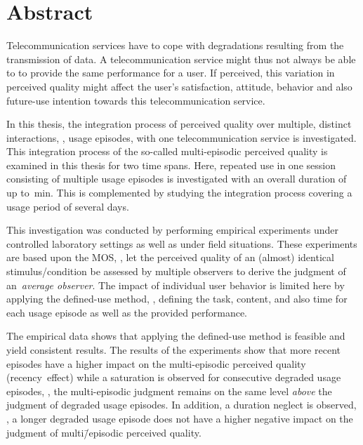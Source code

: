 
\chapter*{Abstract}
Telecommunication services have to cope with degradations resulting from the transmission of data.
A telecommunication service might thus not always be able to to provide the same performance for a user.
If perceived, this variation in perceived quality might affect the user's satisfaction, attitude, behavior and also future-use intention towards this telecommunication service.

In this thesis, the integration process of perceived quality over multiple, distinct interactions, \ie, usage episodes, with one telecommunication service is investigated.
This integration process of the so-called multi-episodic perceived quality is examined in this thesis for two time spans.
Here, repeated use in one session consisting of multiple usage episodes is investigated with an overall duration of up to~\unit[45]{min}.
This is complemented by studying the integration process covering a usage period of several days.

This investigation was conducted by performing empirical experiments under controlled laboratory settings as well as under field situations.
These experiments are based upon the \acs{MOS}, \ie, let the perceived quality of an (almost) identical stimulus/condition be assessed by multiple observers to derive the judgment of an~\emph{average observer}.
The impact of individual user behavior is limited here by applying the defined-use method, \ie, defining the task, content, and also time for each usage episode as well as the provided performance.

The empirical data shows that applying the defined-use method is feasible and yield consistent results.
The results of the experiments show that more recent episodes have a higher impact on the multi-episodic perceived quality (recency~effect) while a saturation is observed for consecutive degraded usage episodes, \ie, the multi-episodic judgment remains on the same level \emph{above} the judgment of degraded usage episodes.
In addition, a duration neglect is observed, \ie, a longer degraded usage episode does not have a higher negative impact on the judgment of multi\=/episodic perceived quality. 

